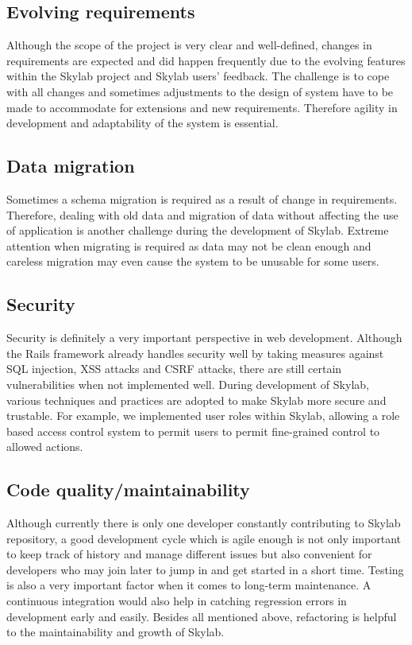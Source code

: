\subsection{Evolving requirements}

Although the scope of the project is very clear and well-defined, changes in requirements are expected and did happen frequently due to the evolving features within the Skylab project and Skylab users' feedback. The challenge is to cope with all changes and sometimes adjustments to the design of system have to be made to accommodate for extensions and new requirements. Therefore agility in development and adaptability of the system is essential.

\subsection{Data migration}

Sometimes a schema migration is required as a result of change in requirements. Therefore, dealing with old data and migration of data without affecting the use of application is another challenge during the development of Skylab. Extreme attention when migrating is required as data may not be clean enough and careless migration may even cause the system to be unusable for some users.

\subsection{Security}

Security is definitely a very important perspective in web development. Although the Rails framework already handles security well by taking measures against SQL injection, XSS attacks and CSRF attacks, there are still certain vulnerabilities when not implemented well. During development of Skylab, various techniques and practices are adopted to make Skylab more secure and trustable. For example, we implemented user roles within Skylab, allowing a role based access control system to permit users to permit fine-grained control to allowed actions.

\subsection{Code quality/maintainability}

Although currently there is only one developer constantly contributing to Skylab repository, a good development cycle which is agile enough is not only important to keep track of history and manage different issues but also convenient for developers who may join later to jump in and get started in a short time. Testing is also a very important factor when it comes to long-term maintenance. A continuous integration would also help in catching regression errors in development early and easily. Besides all mentioned above, refactoring is helpful to the maintainability and growth of Skylab.

